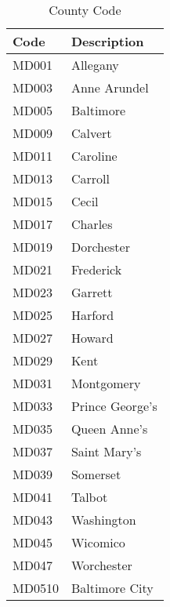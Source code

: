 \documentclass{article}
\begin{document}
\begin{table}
\centering
\begin{tabular}{ll}
\toprule
\textbf{Code} & \textbf{Description} \\ \midrule
MD001         & Allegany             \\ 
MD003         & Anne Arundel         \\ 
MD005         & Baltimore            \\
MD009         & Calvert              \\ 
MD011         & Caroline             \\ 
MD013         & Carroll              \\ 
MD015         & Cecil                \\ 
MD017         & Charles              \\ 
MD019         & Dorchester           \\ 
MD021         & Frederick            \\ 
MD023         & Garrett              \\ 
MD025         & Harford              \\ 
MD027         & Howard               \\ 
MD029         & Kent                 \\ 
MD031         & Montgomery           \\ 
MD033         & Prince George's      \\ 
MD035         & Queen Anne's         \\
MD037         & Saint Mary's         \\
MD039         & Somerset             \\ 
MD041         & Talbot               \\ 
MD043         & Washington           \\ 
MD045         & Wicomico             \\ 
MD047         & Worchester           \\ 
MD0510        & Baltimore City       \\ 
\bottomrule
\end{tabular}
\caption{County Code}
\label{tab:CountyCode}
\end{table}
\end{document}
